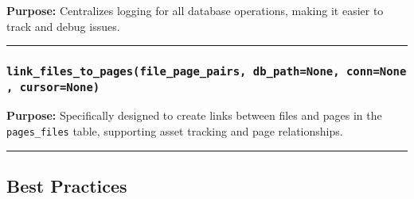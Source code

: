 \textbf{Purpose:} Centralizes logging for all database operations,
making it easier to track and debug issues.

\begin{center}\rule{0.5\linewidth}{0.5pt}\end{center}

\subsubsection{\texorpdfstring{\texttt{link\_files\_to\_pages(file\_page\_pairs,\ db\_path=None,\ conn=None,\ cursor=None)}}{link\_files\_to\_pages(file\_page\_pairs, db\_path=None, conn=None, cursor=None)}}\label{link_files_to_pagesfile_page_pairs-db_pathnone-connnone-cursornone}

\begin{Shaded}
\begin{Highlighting}[]
\OperatorTok{=}\OperatorTok{=}\OperatorTok{=}\NormalTok{):}



\end{Highlighting}
\end{Shaded}

\textbf{Purpose:} Specifically designed to create links between files
and pages in the \texttt{pages\_files} table, supporting asset tracking
and page relationships.

\begin{center}\rule{0.5\linewidth}{0.5pt}\end{center}

\subsection{Best Practices}\label{best-practices}

